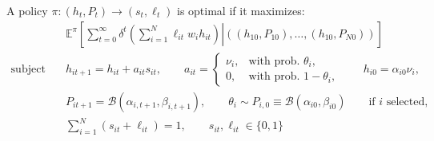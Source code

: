 \documentclass[10 pt]{article}
\newcommand{\sbr}[1]{\left[ #1 \right]}
\newcommand{\pr}[1]{\left( #1 \right)}
\begin{document}
\begin{outline}


A policy $\pi: (h_t, P_t) \to (s_t, \ell_t)$ is optimal if it maximizes:
\begin{align*}
& \mathbb{E}^\pi \sbr{
   \sum_{t=0}^\infty \delta^t 
   \left. \pr{\sum_{i=1}^N \ell_{it} w_i h_{it}} \right\vert
   \pr{(h_{10}, P_{10}), \dots, (h_{10}, P_{N0})}
} \\
\text{subject to} \quad& h_{it+1} = h_{it}+ a_{it} s_{it}, \quad \quad a_{it} = 
   \begin{cases} 
      \nu_i, & \text{with prob. } \theta_i,  \\ 
      0, & \text{with prob. } 1 - \theta_i,
   \end{cases} 
   \quad \quad h_{i0} = \alpha_{i0} \nu_i, \\
\quad& P_{it+1} = \mathcal{B} (\alpha_{i,t+1}, \beta_{i,t+1}), 
   \quad \quad \theta_i \sim P_{i,0} \equiv \mathcal{B} (\alpha_{i0}, \beta_{i0})
   \quad \quad \text{if $i$ selected,} \\
\quad& \sum_{i=1}^N (s_{it} + \ell_{it}) = 1, \quad \quad s_{it}, \ell_{it} \in \{0,1\}
\end{align*}



\end{outline}
\end{document}
